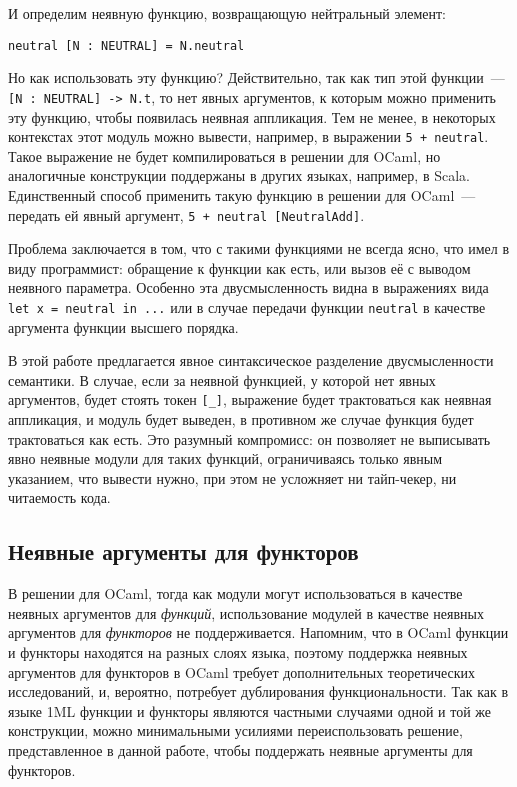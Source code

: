 \documentclass[../diploma.tex]{subfiles}
\begin{document}
И определим неявную функцию, возвращающую нейтральный элемент:

\begin{verbatim}
neutral [N : NEUTRAL] = N.neutral
\end{verbatim}

Но как использовать эту функцию? Действительно, так как тип этой функции~--- \texttt{[N : NEUTRAL] -> N.t}, то нет явных аргументов, к которым можно применить эту функцию, чтобы появилась неявная аппликация. Тем не менее, в некоторых контекстах этот модуль можно вывести, например, в выражении \texttt{5 + neutral}. Такое выражение не будет компилироваться в решении для OCaml, но аналогичные конструкции поддержаны в других языках, например, в Scala. Единственный способ применить такую функцию в решении для OCaml~--- передать ей явный аргумент, \texttt{5 + neutral [NeutralAdd]}.

Проблема заключается в том, что с такими функциями не всегда ясно, что имел в виду программист: обращение к функции как есть, или вызов её с выводом неявного параметра. Особенно эта двусмысленность видна в выражениях вида \texttt{let x = neutral in ...} или в случае передачи функции \texttt{neutral} в качестве аргумента функции высшего порядка. 

В этой работе предлагается явное синтаксическое разделение двусмысленности семантики. В случае, если за неявной функцией, у которой нет явных аргументов, будет стоять токен \texttt{[\_]}, выражение будет трактоваться как неявная аппликация, и модуль будет выведен, в противном же случае функция будет трактоваться как есть. Это разумный компромисс: он позволяет не выписывать явно неявные модули для таких функций, ограничиваясь только явным указанием, что вывести нужно, при этом не усложняет ни тайп-чекер, ни читаемость кода.

\subsection{Неявные аргументы для функторов}

В решении для OCaml, тогда как модули могут использоваться в качестве неявных аргументов для \textit{функций}, использование модулей в качестве неявных аргументов для \textit{функторов} не поддерживается. Напомним, что в OCaml функции и функторы находятся на разных слоях языка, поэтому поддержка неявных аргументов для функторов в OCaml требует дополнительных теоретических исследований, и, вероятно, потребует дублирования функциональности. Так как в языке 1ML функции и функторы являются частными случаями одной и той же конструкции, можно минимальными усилиями переиспользовать решение, представленное в данной работе, чтобы поддержать неявные аргументы для функторов.
\end{document}
